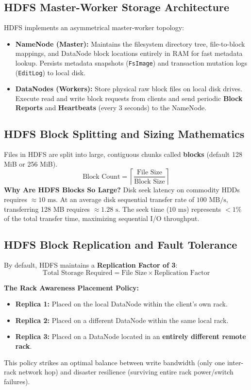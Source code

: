 \subsection{HDFS Master-Worker Storage Architecture}
HDFS implements an asymmetrical master-worker topology:
\begin{itemize}
    \item \textbf{NameNode (Master):} Maintains the filesystem directory tree, file-to-block mappings, and DataNode block locations entirely in RAM for fast metadata lookup. Persists metadata snapshots (\texttt{FsImage}) and transaction mutation logs (\texttt{EditLog}) to local disk.
    \item \textbf{DataNodes (Workers):} Store physical raw block files on local disk drives. Execute read and write block requests from clients and send periodic \textbf{Block Reports} and \textbf{Heartbeats} (every 3 seconds) to the NameNode.
\end{itemize}

\subsection{HDFS Block Splitting and Sizing Mathematics}
Files in HDFS are split into large, contiguous chunks called \textbf{blocks} (default 128 MiB or 256 MiB). 
\begin{equation}
\text{Block Count} = \left\lceil \frac{\text{File Size}}{\text{Block Size}} \right\rceil
\end{equation}
\textbf{Why Are HDFS Blocks So Large?} Disk seek latency on commodity HDDs requires $\approx 10\text{ ms}$. At an average disk sequential transfer rate of $100\text{ MB/s}$, transferring 128 MB requires $\approx 1.28\text{ s}$. The seek time ($10\text{ ms}$) represents $< 1\%$ of the total transfer time, maximizing sequential I/O throughput.

\subsection{HDFS Block Replication and Fault Tolerance}
By default, HDFS maintains a \textbf{Replication Factor of 3}:
\begin{equation}
\text{Total Storage Required} = \text{File Size} \times \text{Replication Factor}
\end{equation}

\textbf{The Rack Awareness Placement Policy:}
\begin{itemize}
    \item \textbf{Replica 1:} Placed on the local DataNode within the client's own rack.
    \item \textbf{Replica 2:} Placed on a different DataNode within the same local rack.
    \item \textbf{Replica 3:} Placed on a DataNode located in an \textbf{entirely different remote rack}.
\end{itemize}
This policy strikes an optimal balance between write bandwidth (only one inter-rack network hop) and disaster resilience (surviving entire rack power/switch failures).

